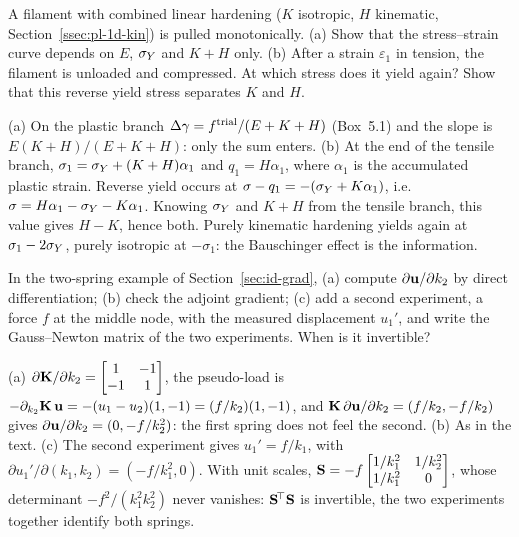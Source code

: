 
\label{exo:id-q-tension}
%
A filament with combined linear hardening ($K$ isotropic, $H$ kinematic,
Section~\ref{ssec:pl-1d-kin}) is pulled monotonically. (a) Show that the
stress--strain curve depends on $E$, $\sigma_{Y}$ and $K+H$ only. (b) After a strain
$\varepsilon_1$ in tension, the filament is unloaded and compressed. At which stress
does it yield again? Show that this reverse yield stress separates $K$ and $H$.
\begin{solution}
(a) On the plastic branch $\Delta\gamma=f^{\mathrm{trial}}/(E+K+H)$ (Box~5.1) and the slope is
$E(K+H)/(E+K+H)$: only the sum enters. (b) At the end of the tensile branch,
$\sigma_1=\sigma_{Y}+(K+H)\alpha_1$ and $q_1=H\alpha_1$, where $\alpha_1$ is the accumulated
plastic strain. Reverse yield occurs at $\sigma-q_1=-(\sigma_{Y}+K\alpha_1)$, i.e.\
$\sigma=H\alpha_1-\sigma_{Y}-K\alpha_1$. Knowing $\sigma_{Y}$ and $K+H$ from the tensile branch,
this value gives $H-K$, hence both. Purely kinematic hardening yields again at
$\sigma_1-2\sigma_{Y}$, purely isotropic at $-\sigma_1$: the Bauschinger effect is the
information.
\end{solution}

\label{exo:id-q-springs}
%
In the two-spring example of Section~\ref{sec:id-grad}, (a) compute
$\partial\mathbf{u}/\partial k_2$ by direct differentiation; (b) check the adjoint
gradient; (c) add a second experiment, a force $f$ at the middle node, with the
measured displacement $u_1'$, and write the Gauss--Newton matrix of the two
experiments. When is it invertible?
\begin{solution}
(a) $\partial\mathbf{K}/\partial k_2=\begin{bmatrix}1&-1\\-1&1\end{bmatrix}$, the
pseudo-load is $-\partial_{k_2}\mathbf{K}\,\mathbf{u}=-(u_1-u_2)(1,-1)=(f/k_2)(1,-1)$, and
$\mathbf{K}\,\partial\mathbf{u}/\partial k_2=(f/k_2,-f/k_2)$ gives
$\partial\mathbf{u}/\partial k_2=(0,-f/k_2^2)$: the first spring does not feel the
second. (b) As in the text. (c) The second experiment gives $u_1'=f/k_1$, with
$\partial u_1'/\partial(k_1,k_2)=(-f/k_1^2,0)$. With unit scales,
$\mathbf{S}=-f\begin{bmatrix}1/k_1^2&1/k_2^2\\1/k_1^2&0\end{bmatrix}$, whose determinant
$-f^2/(k_1^2k_2^2)$ never vanishes: $\mathbf{S}^{\!\top}\mathbf{S}$ is invertible, the two
experiments together identify both springs.
\end{solution}

